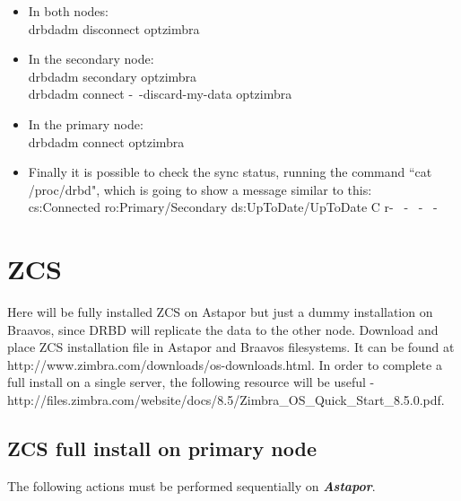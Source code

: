 \documentclass[a4paper, 12pt]{book}
\begin{document}
\begin{itemize}
	\item In both nodes:\\
		drbdadm disconnect optzimbra
	
	\item In the secondary node:\\
		drbdadm secondary optzimbra\\
		drbdadm connect -\ -discard-my-data optzimbra
	
	\item In the primary node:\\
		drbdadm connect optzimbra
	
	\item Finally it is possible to check the sync status, running the command ``cat /proc/drbd", which is going to show a message similar to this:\\
		cs:Connected ro:Primary/Secondary ds:UpToDate/UpToDate C r- \ - \ - \ -

\end{itemize}

\section{ZCS}
\label{sec:zcs}

Here will be fully installed ZCS on Astapor but just a dummy installation on Braavos, since DRBD will replicate the data to the other node. Download and place ZCS installation file in Astapor and Braavos filesystems. It can be found at http://www.zimbra.com/downloads/os-downloads.html. In order to complete a full install on a single server, the following resource will be useful - http://files.zimbra.com/website/docs/8.5/Zimbra\_OS\_Quick\_Start\_8.5.0.pdf.


\subsection{ZCS full install on primary node}
\label{sec:fullinstall}

The following actions must be performed sequentially on \textit{\textbf{Astapor}}.
\end{document}
